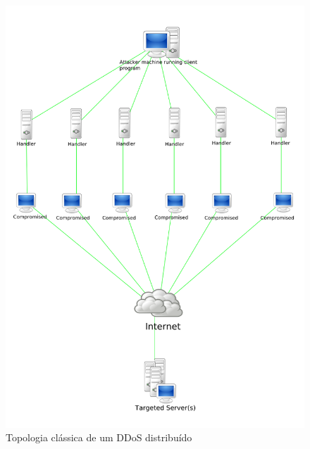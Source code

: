 \documentclass[journal]{IEEEtran}
\begin{document}
\begin{figure}[h!]
	\includegraphics[width=\linewidth]{../fotos_experimento_2/DDos_Attack.png}
	\caption{Topologia clássica de um DDoS distribuído}
	\label{fig:ddos}
\end{figure}

%
%
\end{document}
